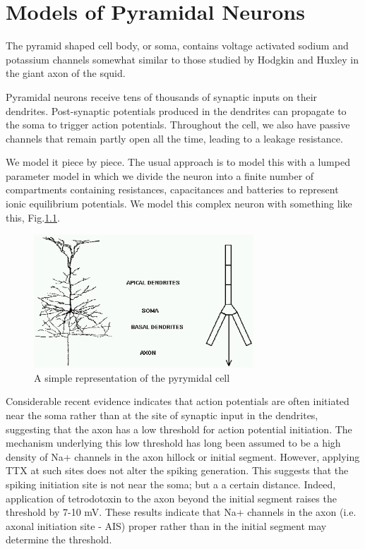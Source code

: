
\chapter{Models of Pyramidal Neurons}
\label{chap:pyramidal-neurons}
 
The pyramid shaped cell body, or soma, contains voltage activated sodium and
potassium channels somewhat similar to those studied by Hodgkin and Huxley in
the giant axon of the squid.

Pyramidal neurons receive tens of thousands of synaptic inputs on their
dendrites. Post-synaptic potentials produced in the dendrites can propagate to
the soma to trigger action potentials. Throughout the cell, we also have passive
channels that remain partly open all the time, leading to a leakage resistance.

We model it piece by piece. The usual approach is to model this with a lumped
parameter model in which we divide the neuron into a finite number of
compartments containing resistances, capacitances and batteries to represent
ionic equilibrium potentials. We model this complex neuron with something like
this, Fig.\ref{fig:compartment_neuron}.

\begin{figure}[hbt]
  \centerline{\includegraphics[height=5cm,
    angle=0]{./images/compartment_neuron.eps}}
\caption{A simple representation of the pyrymidal cell}
\label{fig:compartment_neuron}
\end{figure}

Considerable recent evidence indicates that action potentials are often
initiated near the soma rather than at the site of synaptic input in the
dendrites, suggesting that the axon has a low threshold for action potential
initiation.
The mechanism underlying this low threshold has long been assumed to be a high
density of Na+ channels in the axon hillock or initial segment.
However, applying TTX at such sites does not alter the spiking generation. This
suggests that the spiking initiation site is not near the soma; but a a certain
distance. Indeed, application of tetrodotoxin to the axon beyond the initial
segment raises the threshold by 7-10 mV. These results indicate that Na+
channels in the axon (i.e. axonal initiation site - AIS) proper rather than in
the initial segment may determine the threshold.

